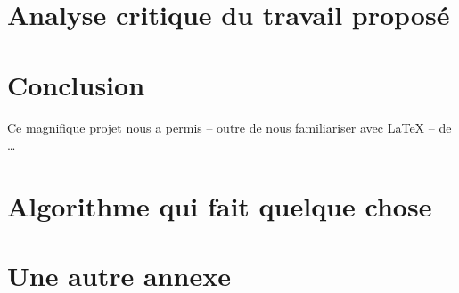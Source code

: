 \documentclass[a4paper, 12pt]{article}
\begin{document}
\clearpage 
\section{Analyse critique du travail proposé}

\clearpage 
\section*{Conclusion}

Ce magnifique projet nous a permis -- outre de nous familiariser avec \LaTeX{} -- de \ldots

\clearpage 




\clearpage 
\appendix
\bigskip{}
\section{Algorithme qui fait quelque chose}


\clearpage 
\section{Une autre annexe}
\cite{DH76}
\end{document}
